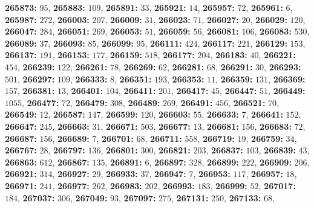 \textsf{\bfseries 265873:} $95$, \textsf{\bfseries 265883:} $109$, \textsf{\bfseries 265891:} $33$, \textsf{\bfseries 265921:} $14$, \textsf{\bfseries 265957:} $72$, \textsf{\bfseries 265961:} $6$, \textsf{\bfseries 265987:} $272$, \textsf{\bfseries 266003:} $207$, \textsf{\bfseries 266009:} $31$, \textsf{\bfseries 266023:} $71$, \textsf{\bfseries 266027:} $20$, \textsf{\bfseries 266029:} $120$, \textsf{\bfseries 266047:} $284$, \textsf{\bfseries 266051:} $269$, \textsf{\bfseries 266053:} $51$, \textsf{\bfseries 266059:} $56$, \textsf{\bfseries 266081:} $106$, \textsf{\bfseries 266083:} $530$, \textsf{\bfseries 266089:} $37$, \textsf{\bfseries 266093:} $85$, \textsf{\bfseries 266099:} $95$, \textsf{\bfseries 266111:} $424$, \textsf{\bfseries 266117:} $221$, \textsf{\bfseries 266129:} $153$, \textsf{\bfseries 266137:} $191$, \textsf{\bfseries 266153:} $177$, \textsf{\bfseries 266159:} $518$, \textsf{\bfseries 266177:} $204$, \textsf{\bfseries 266183:} $40$, \textsf{\bfseries 266221:} $454$, \textsf{\bfseries 266239:} $122$, \textsf{\bfseries 266261:} $78$, \textsf{\bfseries 266269:} $62$, \textsf{\bfseries 266281:} $68$, \textsf{\bfseries 266291:} $30$, \textsf{\bfseries 266293:} $501$, \textsf{\bfseries 266297:} $109$, \textsf{\bfseries 266333:} $8$, \textsf{\bfseries 266351:} $193$, \textsf{\bfseries 266353:} $11$, \textsf{\bfseries 266359:} $131$, \textsf{\bfseries 266369:} $157$, \textsf{\bfseries 266381:} $13$, \textsf{\bfseries 266401:} $104$, \textsf{\bfseries 266411:} $201$, \textsf{\bfseries 266417:} $45$, \textsf{\bfseries 266447:} $51$, \textsf{\bfseries 266449:} $1055$, \textsf{\bfseries 266477:} $72$, \textsf{\bfseries 266479:} $308$, \textsf{\bfseries 266489:} $269$, \textsf{\bfseries 266491:} $456$, \textsf{\bfseries 266521:} $70$, \textsf{\bfseries 266549:} $12$, \textsf{\bfseries 266587:} $147$, \textsf{\bfseries 266599:} $120$, \textsf{\bfseries 266603:} $55$, \textsf{\bfseries 266633:} $7$, \textsf{\bfseries 266641:} $152$, \textsf{\bfseries 266647:} $245$, \textsf{\bfseries 266663:} $31$, \textsf{\bfseries 266671:} $503$, \textsf{\bfseries 266677:} $13$, \textsf{\bfseries 266681:} $156$, \textsf{\bfseries 266683:} $72$, \textsf{\bfseries 266687:} $156$, \textsf{\bfseries 266689:} $7$, \textsf{\bfseries 266701:} $68$, \textsf{\bfseries 266711:} $558$, \textsf{\bfseries 266719:} $19$, \textsf{\bfseries 266759:} $34$, \textsf{\bfseries 266767:} $28$, \textsf{\bfseries 266797:} $136$, \textsf{\bfseries 266801:} $300$, \textsf{\bfseries 266821:} $203$, \textsf{\bfseries 266837:} $103$, \textsf{\bfseries 266839:} $43$, \textsf{\bfseries 266863:} $612$, \textsf{\bfseries 266867:} $135$, \textsf{\bfseries 266891:} $6$, \textsf{\bfseries 266897:} $328$, \textsf{\bfseries 266899:} $222$, \textsf{\bfseries 266909:} $206$, \textsf{\bfseries 266921:} $314$, \textsf{\bfseries 266927:} $29$, \textsf{\bfseries 266933:} $37$, \textsf{\bfseries 266947:} $7$, \textsf{\bfseries 266953:} $117$, \textsf{\bfseries 266957:} $18$, \textsf{\bfseries 266971:} $241$, \textsf{\bfseries 266977:} $262$, \textsf{\bfseries 266983:} $202$, \textsf{\bfseries 266993:} $183$, \textsf{\bfseries 266999:} $52$, \textsf{\bfseries 267017:} $184$, \textsf{\bfseries 267037:} $306$, \textsf{\bfseries 267049:} $93$, \textsf{\bfseries 267097:} $275$, \textsf{\bfseries 267131:} $250$, \textsf{\bfseries 267133:} $68$, 
